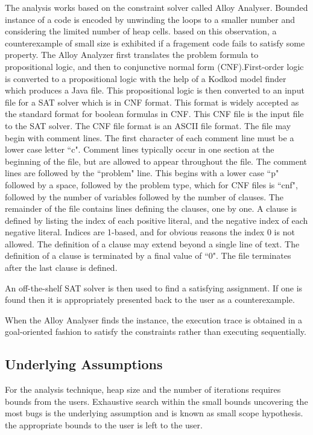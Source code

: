 \documentclass[a4paper,10pt]{report}
\begin{document}
The analysis works based on the constraint solver called Alloy Analyser. Bounded instance of a code is encoded by unwinding the loops to a smaller number and considering the limited number of heap cells. based on this observation, a counterexample of small size is exhibited if a fragement code fails to satisfy some property. The Alloy Analyzer first translates the problem formula to propositional logic, and then to conjunctive normal form (CNF).First-order logic is converted to a propositional logic with the help of a Kodkod model finder which produces a Java file. This propositional logic is then converted to an input file for a SAT solver which is in CNF format. This format is widely accepted as the standard format for boolean formulas in CNF. This CNF file is the input file to the SAT solver. The CNF file format is an ASCII file format. The file may begin with comment lines. The first character of each comment line must be a lower case letter ``c". Comment lines typically occur in one section at the beginning of the file, but are allowed to appear throughout the file. The comment lines are followed by the ``problem" line. This begins with a lower case ``p" followed by a space, followed by the problem type, which for CNF files is ``cnf", followed by the number of variables followed by the number of clauses. The remainder of the file contains lines defining the clauses, one by one. A clause is defined by listing the index of each positive literal, and the negative index of each negative literal. Indices are 1-based, and for obvious reasons the index 0 is not allowed. The definition of a clause may extend beyond a single line of text. The definition of a clause is terminated by a final value of ``0". The file terminates after the last clause is defined.

An off-the-shelf SAT solver is then used to find a satisfying assignment. If one is found then it is appropriately presented back to the user as a counterexample\cite{Vaziri-Farahani2004}.

When the Alloy Analyser finds the instance, the execution trace is obtained in a goal-oriented fashion to satisfy the constraints rather than executing sequentially. 

\subsection{Underlying Assumptions}
\label{Assumptions}
For the analysis technique, heap size and the number of iterations requires bounds from the users\cite{Vaziri-Farahani2004}. Exhaustive search within the small bounds uncovering the most bugs is the underlying assumption and is known as small scope hypothesis. the appropriate bounds to the user is left to the user. 
\end{document}
